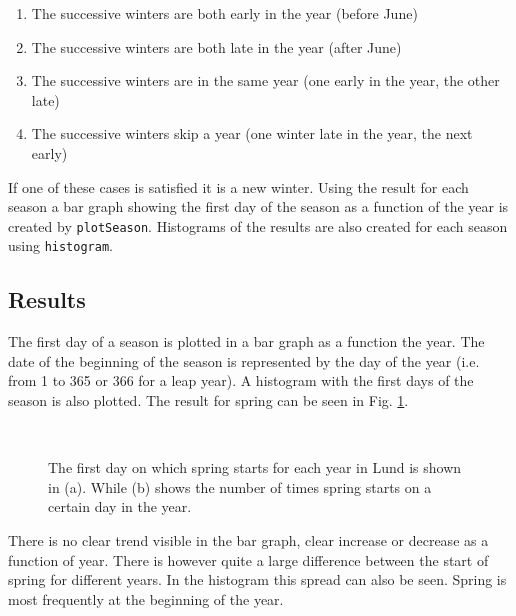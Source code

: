 \begin{enumerate}
\item The successive winters are both early in the year (before June)
\item The successive winters are both late in the year (after June)
\item The successive winters are in the same year (one early in the year, the other late)
\item The successive winters skip a year (one winter late in the year, the next early)
\end{enumerate}

If one of these cases is satisfied it is a new winter. Using the result for each season a bar graph showing the first day of the season as a function of the year is created by \texttt{plotSeason}. Histograms of the results are also created for each season using \texttt{histogram}. 

\subsection{Results}

The first day of a season is plotted in a bar graph as a function the year. The date of the beginning of the season is represented by the day of the year (i.e. from 1 to 365 or 366 for a leap year). A histogram with the first days of the season is also plotted. The result for spring can be seen in Fig. \ref{fig:spring}. \\

\begin{figure}[ht!]
\centering
{} 
\\
\caption{The first day on which spring starts for each year in Lund is shown in (a).  While (b) shows the number of times spring starts on a certain day in the year.}
\label{fig:spring}
\end{figure}

There is no clear trend visible in the bar graph, clear increase or decrease as a function of year. There is however quite a large difference between the start of spring for different years. In the histogram this spread can also be seen. Spring is most frequently at the beginning of the year. \\

